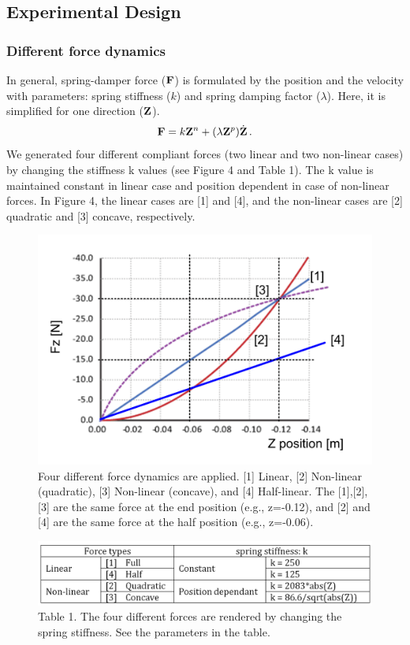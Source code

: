 \subsection{Experimental Design}

\subsubsection{Different force dynamics}
In general, spring-damper force ($\mathbf{F}$) is formulated by the position and the
velocity with parameters: spring stiffness ($k$) and spring damping factor
($\lambda$).  Here, it is simplified for one direction ($\mathbf{Z}$).
%
\begin{equation}
  \mathbf{F} = k \mathbf{Z}^n + (\lambda \mathbf{Z}^p) \dot{\mathbf{Z}} \, .
\end{equation}
%
We generated four different compliant forces (two linear and two non-linear cases) by changing the stiffness k values (see Figure 4 and Table 1). The k value is maintained constant in linear case and position dependent in case of non-linear forces. In Figure 4, the linear cases are [1] and [4], and the non-linear cases are [2] quadratic and [3] concave, respectively.
\begin{figure}
  \centering
  \includegraphics[scale=0.5]{Chie/figs/Figure4.png}
  \caption{Four different force dynamics are applied. [1] Linear, [2] Non-linear (quadratic), [3] Non-linear (concave), and [4] Half-linear. The [1],[2],[3] are the same force at the end position (e.g., z=-0.12), and [2] and [4] are the same force at the half position  (e.g., z=-0.06).}
  \label{forcedyn}
\end{figure}

\begin{figure}
  \centering
  \includegraphics[scale=0.4]{Chie/figs/Table1.png}
  \caption{Table 1. The four different forces are rendered by changing the spring stiffness. See the parameters in the table.}
  \label{Table1}
\end{figure}

